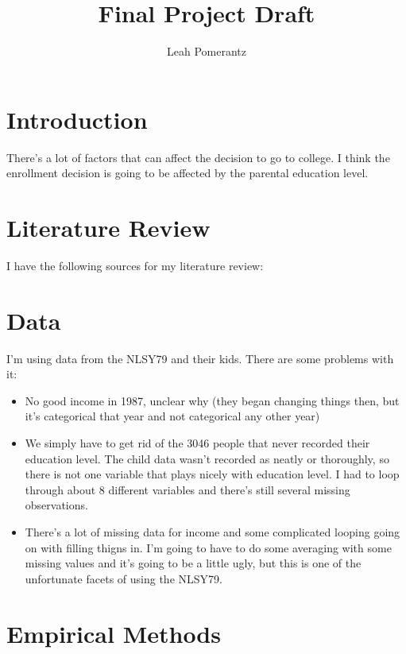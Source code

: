 \documentclass{article}
\title{Final Project Draft}
\author{Leah Pomerantz}
\begin{document}
\maketitle

\section{Introduction}

There's a lot of factors that can affect the decision to go to college. I think the enrollment decision is going to be affected by the parental education level. 

\section{Literature Review}

I have the following sources for my literature review:

\cite{pastor21}
\cite{cheng17}
\cite{fol10}
\cite{Gong19}
\cite{Kodde88}
\cite{lemke03}


\section{Data}

I'm using data from the NLSY79 and their kids. There are some problems with it:
\begin{itemize}
    \item No good income in 1987, unclear why (they began changing things then, but it’s categorical that year and not categorical any other year)
    \item We simply have to get rid of the 3046 people that never recorded their education level. The child data wasn't recorded as neatly or thoroughly, so there is not one variable that plays nicely with education level. I had to loop through about 8 different variables and there's still several missing observations.
    \item There's a lot of missing data for income and some complicated looping going on with filling thigns in. I'm going to have to do some averaging with some missing values and it's going to be a little ugly, but this is one of the unfortunate facets of using the NLSY79.

\end{itemize}

\section{Empirical Methods}
\end{document}
